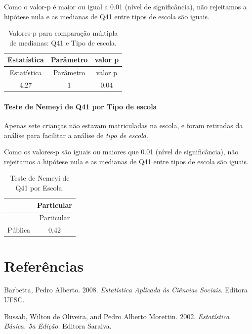 \documentclass[]{article}
\let\oldparagraph\paragraph
\renewcommand{\paragraph}[1]{\oldparagraph{#1}\mbox{}}
\begin{document}
Como o valor-p é maior ou igual a 0.01 (nível de significância), não rejeitamos a hipótese nula e as medianas de Q41 entre tipos de escola são iguais.

\begin{longtable}[]{@{}ccc@{}}
\caption{\label{tab:unnamed-chunk-1653}Valores-p para comparação múltipla de medianas: Q41 e Tipo de escola.}\tabularnewline
\toprule
Estatística & Parâmetro & valor p\tabularnewline
\midrule
\endfirsthead
\toprule
Estatística & Parâmetro & valor p\tabularnewline
\midrule
\endhead
4,27 & 1 & 0,04\tabularnewline
\bottomrule
\end{longtable}

\hypertarget{teste-de-nemeyi-de-q41-por-tipo-de-escola}{%
\paragraph{Teste de Nemeyi de Q41 por Tipo de escola}\label{teste-de-nemeyi-de-q41-por-tipo-de-escola}}

Apenas sete crianças não estavam matriculadas na escola, e foram retiradas da análise para facilitar a análise de \emph{tipo de escola}.

Como os valores-p são iguais ou maiores que 0.01 (nível de significância), não rejeitamos a hipótese nula e as medianas de Q41 entre tipos de escola são iguais.

\begin{longtable}[]{@{}lc@{}}
\caption{\label{tab:unnamed-chunk-1655}Teste de Nemeyi de Q41 por Escola.}\tabularnewline
\toprule
& Particular\tabularnewline
\midrule
\endfirsthead
\toprule
& Particular\tabularnewline
\midrule
\endhead
Pública & 0,42\tabularnewline
\bottomrule
\end{longtable}

\cleardoublepage

\hypertarget{referuxeancias}{%
\section*{Referências}\label{referuxeancias}}

\hypertarget{refs}{}
\leavevmode\hypertarget{ref-barbetta2008estatistica}{}%
Barbetta, Pedro Alberto. 2008. \emph{Estatística Aplicada às Ciências Sociais}. Editora UFSC.

\leavevmode\hypertarget{ref-bussab2002estatistica}{}%
Bussab, Wilton de Oliveira, and Pedro Alberto Morettin. 2002. \emph{Estatística Básica. 5a Edição}. Editora Saraiva.
\end{document}

